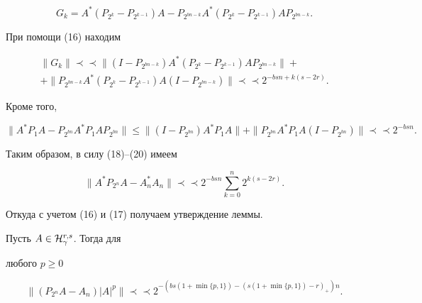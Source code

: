 \begin{pf}
$$


G_k = A^*(P_{2^k}-P_{2^{k-1}})A -


P_{2^{bn-k}}A^*(P_{2^k}-P_{2^{k-1}})AP_{2^{bn-k}}.


$$


При помощи (16) находим


\begin{multline}


\|G_k\| \prec\prec


\|(I-P_{2^{bn-k}})A^*(P_{2^k}-P_{2^{k-1}})AP_{2^{bn-k}}\| + \\


%


+ \|P_{2^{bn-k}}A^*(P_{2^k}-P_{2^{k-1}})A(I-P_{2^{bn-k}})\|


\prec\prec  2^{-bsn+k(s-2r)}.


\end{multline}


Кроме того,


\begin{equation}


\|A^*P_1A - P_{2^{bn}}A^*P_1AP_{2^{bn}}\|


\le \|(I-P_{2^{bn}})A^*P_1A\| +


\|P_{2^{bn}}A^*P_1A(I-P_{2^{bn}})\|  \prec\prec


2^{-bsn}.


\end{equation}


Таким образом, в силу (18)--(20) имеем


$$


\|A^*P_{2^n}A - A^*_nA_n\| \prec\prec


2^{-bsn}\sum_{k=0}^n2^{k(s-2r)} .


$$


Откуда с учетом (16) и (17) получаем утверждение леммы.


\end{pf}





\begin{lem}  Пусть $A \in {\cal H}_\gamma^{r,s}$. Тогда для


любого $p\ge 0$


$$


\|(P_{2^n}A - A_n)|A|^p\|  \prec\prec


2^{-(bs(1+\min\{p,1\})-(s(1+\min\{p,1\})-r)_+)n} .


$$


\end{lem}





